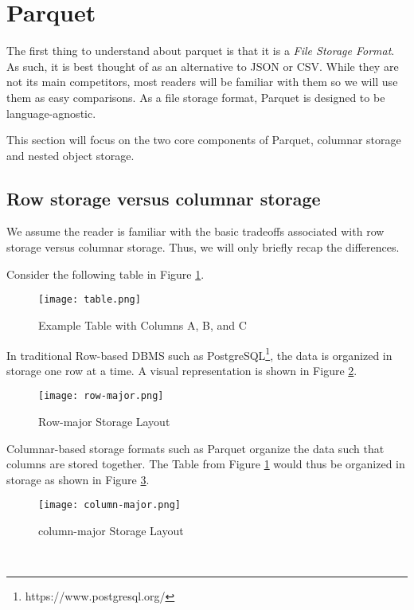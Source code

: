 \section{Parquet} \label{sec:parquet}

The first thing to understand about parquet is that it is a \textit{File Storage Format}.
As such, it is best thought of as an alternative to JSON or CSV.
While they are not its main competitors, most readers will be familiar with them so we will use them as easy comparisons.
As a file storage format, Parquet is designed to be language-agnostic.

This section will focus on the two core components of Parquet, columnar storage and nested object storage.

\subsection{Row storage versus columnar storage}

We assume the reader is familiar with the basic tradeoffs associated with row storage versus columnar storage.
Thus, we will only briefly recap the differences.

Consider the following table in Figure \ref{fig:table}. \\
\begin{figure}[h]
\centering
\texttt{[image: table.png]}
\caption{Example Table with Columns A, B, and C}
\label{fig:table}
\end{figure}

In traditional Row-based DBMS such as PostgreSQL\footnote{https://www.postgresql.org/}, the data is organized in storage one row at a time.
A visual representation is shown in Figure \ref{fig:row-major}. \\
\begin{figure}[h]
\centering
\texttt{[image: row-major.png]}
\caption{Row-major Storage Layout}
\label{fig:row-major}
\end{figure}

Columnar-based storage formats such as Parquet organize the data such that columns are stored together.
The Table from Figure \ref{fig:table} would thus be organized in storage as shown in Figure \ref{fig:column-major}.
\begin{figure}[h]
\centering
\texttt{[image: column-major.png]}
\caption{column-major Storage Layout}
\label{fig:column-major}
\end{figure}
\\

